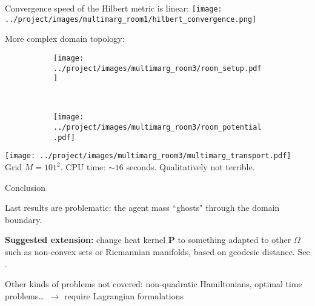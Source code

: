 \documentclass[xcolor={dvipsnames}]{beamer}
\newcommand{\bfP}{\mathbf{P}}
\newcommand{\redfont}{\color{darkred}}
\begin{document}
\begin{frame}
	Convergence speed of the Hilbert metric is linear:
	\texttt{[image: ../project/images/multimarg\_room1/hilbert\_convergence.png]}
\end{frame}

\begin{frame}
	
	More complex domain topology:
	
	\begin{figure}
		\begin{subfigure}{.45\linewidth}
			\texttt{[image: ../project/images/multimarg\_room3/room\_setup.pdf]}
		\end{subfigure}~
		\begin{subfigure}{.49\linewidth}
			\texttt{[image: ../project/images/multimarg\_room3/room\_potential.pdf]}
		\end{subfigure}
	\end{figure}
	
\end{frame}


\begin{frame}
	
	\texttt{[image: ../project/images/multimarg\_room3/multimarg\_transport.pdf]}
	Grid $M=101^2$. CPU time: $\sim 16$ seconds.
	{\redfont Qualitatively not terrible.}
\end{frame}


\begin{frame}{Conclusion}
	
	Last results are problematic: the agent mass ``ghosts" through the domain boundary.
	
	\textbf{Suggested extension:} change heat kernel $\bfP$ to something adapted to other $\Omega$ such as non-convex sets or Riemannian manifolds, based on geodesic distance. See \textcite{peyr2015entropic}.
	
	Other kinds of problems not covered: non-quadratic Hamiltonians, optimal time problems\ldots~$\rightarrow$ require Lagrangian formulations
	
\end{frame}



\begin{frame}[allowframebreaks]	
	\printbibliography{}
\end{frame}
\end{document}
